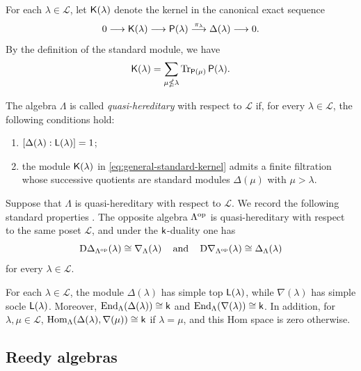 For each $\lambda\in\mathcal{L}$, let $\mathsf K(\lambda)$ denote the kernel in the canonical exact sequence
\begin{equation}
0
\longrightarrow
\mathsf K(\lambda)
\longrightarrow
\mathsf P(\lambda)
\overset{\pi_{\lambda}}{\longrightarrow}
\Delta(\lambda)
\longrightarrow
0.
\label{eq:general-standard-kernel}
\end{equation}
By the definition of the standard module, we have 
\begin{equation}
\mathsf K(\lambda)
=
\sum_{\mu\nleq\lambda}
\operatorname{Tr}_{\mathsf P(\mu)}\mathsf P(\lambda).
\label{eq:general-standard-kernel-trace}
\end{equation}

\begin{definition}
The algebra $\Lambda$ is called \emph{quasi-hereditary} with respect to
$\mathcal L$ if, for every $\lambda\in\mathcal L$, the following
conditions hold:
\begin{enumerate}
    \item $[\Delta(\lambda):\mathsf L(\lambda)]=1$;
    \item the module $\mathsf K(\lambda)$ in
\eqref{eq:general-standard-kernel} admits a finite filtration whose
successive quotients are standard modules $\Delta(\mu)$ with
$\mu>\lambda$.
\end{enumerate}
\end{definition}

Suppose that $\Lambda$ is quasi-hereditary with respect to
$\mathcal L$. We record the following standard properties
\cite{CPS,DR89}. The opposite algebra $\Lambda^{\mathrm{op}}$ is
quasi-hereditary with respect to the same poset $\mathcal L$, and
under the $\mathsf{k}$-duality one has
\begin{equation}
\mathrm D\Delta_{\Lambda^{\mathrm{op}}}(\lambda)
\cong
\nabla_{\Lambda}(\lambda)
\operatorname{\quad \text{and} \quad}\nolimits
\mathrm D\nabla_{\Lambda^{\mathrm{op}}}(\lambda)
\cong
\Delta_{\Lambda}(\lambda)
\label{eq:QH-opposite-standard-costandard-duality}
\end{equation}
for every $\lambda\in\mathcal L$.

For each $\lambda\in\mathcal L$, the module $\Delta(\lambda)$ has
simple top $\mathsf L(\lambda)$, while $\nabla(\lambda)$ has simple socle
$\mathsf L(\lambda)$. Moreover,
$\operatorname{End}_\Lambda(\Delta(\lambda))\cong\mathsf{k}$ and
$\operatorname{End}_\Lambda(\nabla(\lambda))\cong\mathsf{k}$.
In addition, for $\lambda,\mu\in\mathcal L$,
$\operatorname{Hom}_\Lambda(\Delta(\lambda),\nabla(\mu))\cong\mathsf{k}$ if
$\lambda=\mu$, and this Hom space is zero otherwise.


\subsection{Reedy algebras}\label{sec:prelim-reedy}

